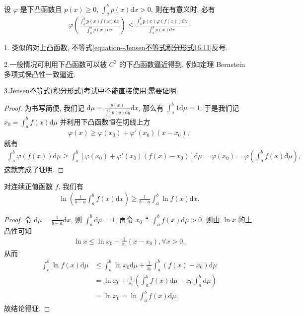 \documentclass[../../main.tex]{subfiles}%
\begin{document}
\begin{theorem}\label{theorem:Jensen不等式积分形式}
设 $\varphi$ 是下凸函数且 $p(x) \geqslant 0$, $\int_a^b p(x) \mathrm{d}x > 0$, 则在有意义时, 必有
\begin{align}\label{equation--Jensen不等式积分形式16.11}
\varphi\left(\frac{\int_a^b p(x)f(x)\mathrm{d}x}{\int_a^b p(x)\mathrm{d}x}\right) \leqslant \frac{\int_a^b p(x)\varphi(f(x))\mathrm{d}x}{\int_a^b p(x)\mathrm{d}x}.
\end{align}
\end{theorem}
\begin{note}
1. 类似的对上凸函数, 不等式\eqref{equation--Jensen不等式积分形式16.11}反号.

2.一般情况可利用下凸函数可以被 $C^2$ 的下凸函数逼近得到, 例如定理 Bernstein 多项式保凸性一致逼近. 

3.Jensen不等式(积分形式)考试中不能直接使用,需要证明.
\end{note}
\begin{proof}
为书写简便, 我们记 $\mathrm{d}\mu = \frac{p(x)}{\int_a^b p(y)\mathrm{d}y}\mathrm{d}x$, 那么有 $\int_a^b 1\mathrm{d}\mu = 1$. 于是我们记 $x_0 = \int_a^b f(x)\mathrm{d}\mu$ 并利用下凸函数恒在切线上方
\begin{align*}
\varphi(x) \geqslant \varphi(x_0) + \varphi'(x_0)(x - x_0),
\end{align*}
就有
\begin{align*}
\int_a^b \varphi(f(x))\mathrm{d}\mu \geqslant \int_a^b [\varphi(x_0) + \varphi'(x_0)(f(x) - x_0)]\mathrm{d}\mu = \varphi(x_0) = \varphi\left(\int_a^b f(x)\mathrm{d}\mu\right),
\end{align*}
这就完成了证明. 
\end{proof}

\begin{example}
对连续正值函数 $f$, 我们有
\begin{align*}
\ln\left(\frac{1}{b - a}\int_a^b f(x)\mathrm{d}x\right) \geqslant \frac{1}{b - a}\int_a^b \ln f(x)\mathrm{d}x.
\end{align*} 
\end{example}
\begin{proof}
令 $\mathrm{d}\mu = \frac{1}{b - a}\mathrm{d}x$, 则 $\int_a^b \mathrm{d}\mu = 1$, 再令 $x_0 \triangleq \int_a^b f(x) \mathrm{d}\mu>0$, 则由 $\ln x$ 的上凸性可知
\begin{align*}
\ln x \leqslant \ln x_0 + \frac{1}{x_0}(x - x_0), \forall x > 0.
\end{align*}
从而
\begin{align*}
\int_a^b \ln f(x) \mathrm{d}\mu &\leqslant \int_a^b \ln x_0 \mathrm{d}\mu + \frac{1}{x_0}\int_a^b (f(x) - x_0) \mathrm{d}\mu \\
&= \ln x_0 + \frac{1}{x_0}\left(\int_a^b f(x) \mathrm{d}\mu - x_0\int_a^b \mathrm{d}\mu\right) \\
&= \ln x_0 = \ln \int_a^b f(x) \mathrm{d}\mu.
\end{align*}
故结论得证.
\end{proof}
\end{document}
